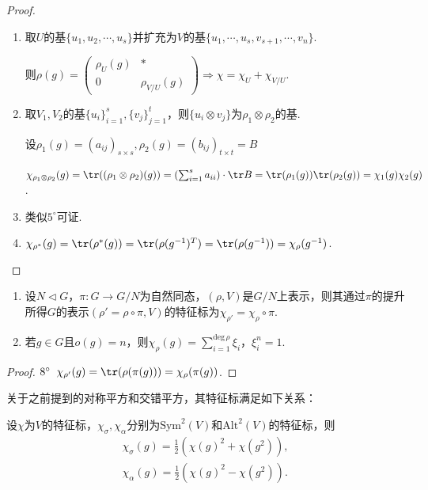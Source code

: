 \begin{proof}
    \begin{enumerate}
        \item[$4^\circ$] 取$U$的基$\{u_1,u_2,\cdots,u_s\}$并扩充为$V$的基$\{u_1,\cdots,u_s,v_{s+1},\cdots,v_n\}$.\par
        则$\rho(g)=\begin{pmatrix}
        \rho_U(g) & * \\
        0 & \rho_{V/U}(g)
        \end{pmatrix}\Rightarrow \chi=\chi_U+\chi_{V/U}$.
        \item[$5^\circ$] 取$V_1,V_2$的基$\{u_i\}_{i=1}^s,\{v_j\}_{j=1}^t$，则$\{u_i\otimes v_j\}$为$\rho_1\otimes\rho_2$的基.\par
        设$\rho_1(g)=(a_{ij})_{s\times s},\rho_2(g)=(b_{ij})_{t\times t}=B$\par
        $\chi_{\rho_1\otimes\rho_2}(g)=\tr((\rho_1\otimes\rho_2)(g))=(\sum_{i=1}^s a_{ii})\cdot \tr B=\tr(\rho_1(g))\tr(\rho_2(g))=\chi_1(g)\chi_2(g)$.
        \item[$6^\circ$] 类似$5^\circ$可证.
        \item[$7^\circ$] $\chi_{\rho^*}(g)=\tr(\rho^*(g))=\tr(\rho(g^{-1})^T)=\tr(\rho(g^{-1}))=\chi_\rho(g^{-1})$.
    \end{enumerate}
\end{proof}

\begin{property}[]
    \begin{enumerate}
        \item[$8^\circ$]设$N\vartriangleleft G$，$\pi:G\to G/N$为自然同态，$(\rho,V)$是$G/N$上表示，则其通过$\pi$的提升所得$G$的表示$(\rho'=\rho\circ\pi,V)$的特征标为$\chi_{\rho'}=\chi_\rho\circ\pi$.
        \item[$9^\circ$] 若$g\in G$且$o(g)=n$，则$\chi_\rho(g)=\sum_{i=1}^{\mathrm{deg}\,\rho}\xi_i$，$\xi_i^n=1$.
    \end{enumerate}
\end{property}

\begin{proof}
    $8^\circ\;\; \chi_{\rho'}(g)=\tr(\rho(\pi(g)))=\chi_\rho(\pi(g))$.
\end{proof}

关于之前提到的对称平方和交错平方，其特征标满足如下关系：
\begin{theorem}[对称平方和交错平方的特征标]
    设$\chi$为$V$的特征标，$\chi_\sigma,\chi_\alpha$分别为$\mathrm{Sym}^2(V)$和$\mathrm{Alt}^2(V)$的特征标，则
    \begin{gather*}
        \chi_\sigma(g)=\frac{1}{2}(\chi(g)^2+\chi(g^2)),\\
        \chi_\alpha(g)=\frac{1}{2}(\chi(g)^2-\chi(g^2)).
    \end{gather*}
\end{theorem}

